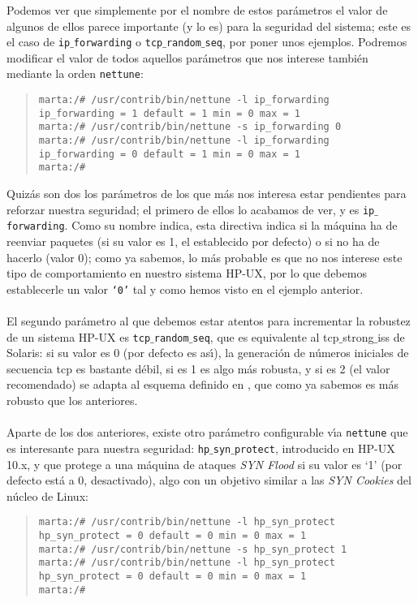 Podemos ver que simplemente por el nombre de estos par\'ametros el valor de 
algunos de ellos parece importante (y lo es) para la seguridad del sistema; 
este es el caso de {\tt ip$\_$forwarding} o {\tt tcp$\_$random$\_$seq}, por 
poner unos ejemplos. Podremos modificar el valor de todos aquellos par\'ametros
que nos interese tambi\'en mediante la orden {\tt nettune}:
\begin{quote}
\begin{verbatim}
marta:/# /usr/contrib/bin/nettune -l ip_forwarding 
ip_forwarding = 1 default = 1 min = 0 max = 1
marta:/# /usr/contrib/bin/nettune -s ip_forwarding 0
marta:/# /usr/contrib/bin/nettune -l ip_forwarding
ip_forwarding = 0 default = 1 min = 0 max = 1
marta:/#
\end{verbatim}
\end{quote}
Quiz\'as son dos los par\'ametros de los que m\'as nos interesa estar pendientes
para reforzar nuestra seguridad; el primero de ellos lo acabamos de ver, y es
{\tt ip$\_$forwarding}. Como su nombre indica, esta directiva indica si la 
m\'aquina ha de reenviar paquetes (si su valor es 1, el establecido por defecto)
o si no ha de hacerlo (valor 0); como ya sabemos, lo m\'as probable es que no 
nos interese este tipo de comportamiento en nuestro sistema HP-UX, por lo que
debemos establecerle un valor {\tt `0'} tal y como hemos visto en el ejemplo
anterior.\\
\\El segundo par\'ametro al que debemos estar atentos para incrementar la 
robustez de un sistema HP-UX es {\tt tcp$\_$random$\_$seq}, que es equivalente
al {\sc tcp$\_$strong$\_$iss} de Solaris: si su valor es 0 (por defecto es 
as\'{\i}), la generaci\'on de n\'umeros iniciales de secuencia {\sc tcp} es
bastante d\'ebil, si es 1 es algo m\'as robusta, y si es 2 (el valor 
recomendado) se adapta al esquema definido en \cite{kn:rfc1498}, que como ya 
sabemos es m\'as robusto que los anteriores.\\
\\Aparte de los dos anteriores, existe otro par\'ametro configurable v\'{\i}a 
{\tt nettune} que es interesante para nuestra seguridad: 
{\tt hp$\_$syn$\_$protect}, introducido en HP-UX 10.x, y que protege a una 
m\'aquina de ataques {\it SYN Flood} si su valor es `1' (por defecto est\'a a 
0, desactivado), algo con un objetivo similar a las {\it SYN Cookies} del 
n\'ucleo de Linux:
\begin{quote}
\begin{verbatim}
marta:/# /usr/contrib/bin/nettune -l hp_syn_protect
hp_syn_protect = 0 default = 0 min = 0 max = 1
marta:/# /usr/contrib/bin/nettune -s hp_syn_protect 1
marta:/# /usr/contrib/bin/nettune -l hp_syn_protect
hp_syn_protect = 0 default = 0 min = 0 max = 1
marta:/#
\end{verbatim}
\end{quote}
